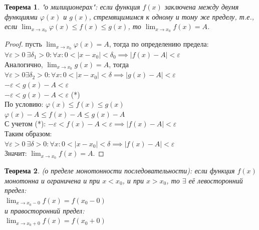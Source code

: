 \documentclass[12pt, a4paper]{article}
\newtheorem{theorem}{Теорема}[subsection]
\theoremstyle{remark}
\newcommand{\Y}{\mathbb{\forall}}
\newcommand{\F}{\mathbb{\exists}}
\newcommand{\E}{\mathbb{\varepsilon}}
\begin{document}
	\begin{theorem}
		"о милиционерах": если функция $f(x)$ заключена между двумя функциями $\varphi(x)$ и $g(x)$, стремящимимся к одному и тому же пределу, т.е., если $\lim_{x \to x_0} \varphi(x) \leq f(x) \leq g(x)$, то $\lim_{x \to x_0} f(x) = A$.
	\end{theorem}
	
	\begin{proof}
		пусть $\lim_{x \to x_0} \varphi(x) = A$, тогда по определению предела: \\
		
		$\Y\E > 0 \ \F\delta_1 > 0: \Y x: 0 < |x - x_0| < \delta_0 \implies |f(x) - A| < \E$ \\
		
		Аналогично, $\lim_{x \to x_0} g(x) = A$, тогда \\
		
		$\Y\E > 0 \F\delta_2 > 0: \Y x: 0 < |x - x_0| < \delta \implies |g(x) - A| < \E$ \\
		
		$-\E < g(x) - A < \E$ \\
		
		$-\E < g(x) - A < \E$ (*) \\
		
		По условию: $\varphi(x) \leq f(x) \leq g(x)$ \\
		
		$\varphi(x) - A \leq f(x) - A \leq g(x) - A$ \\ 
		
		С учетом (*): $-\E < f(x) - A < \E \implies |f(x) - A| < \E$ \\
		
		Таким образом: \\
		
		$\Y\E > 0 \ \F \delta > 0: \Y x: 0 < |x - x_0| < \delta \implies |f(x) - A| < \E$ \\
		
		Значит: $\lim_{x \to x_0} f(x) = A$.
	\end{proof}
	
	\begin{theorem}
		(о пределе монотонности последовательности): если функция $f(x)$ монотонна и ограничена и при $x < x_0$, и при $x > x_0$, то $\F$ её левосторонний предел: \\
		
		$\lim_{x \to x_0 - 0} f(x) = f(x_0 - 0)$ \\
		
		и правосторонний предел: \\
		
		$\lim_{x \to x_0 + 0} f(x) = f(x_0 + 0)$
	\end{theorem}
	
\end{document}
